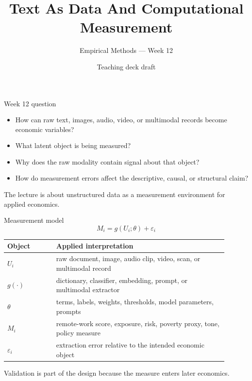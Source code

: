 \documentclass[aspectratio=169,11pt]{beamer}
\title{Text As Data And Computational Measurement}
\subtitle{Empirical Methods --- Week 12}
\author{Teaching deck draft}
\date{}
\newcommand{\1}{\mathbf{1}}
\begin{document}
\begin{frame}
  \titlepage
\end{frame}

\begin{frame}{Week 12 question}
\begin{itemize}
    \item How can raw text, images, audio, video, or multimodal records become economic variables?
    \item What latent object is being measured?
    \item Why does the raw modality contain signal about that object?
    \item How do measurement errors affect the descriptive, causal, or structural claim?
\end{itemize}

\medskip
The lecture is about unstructured data as a measurement environment for applied economics.
\end{frame}

\begin{frame}{Measurement model}
\small
\[
M_i = g(U_i;\theta)+\varepsilon_i
\]

\begin{tabular}{p{0.20\linewidth} p{0.70\linewidth}}
\toprule
Object & Applied interpretation \\
\midrule
\(U_i\) & raw document, image, audio clip, video, scan, or multimodal record \\
\(g(\cdot)\) & dictionary, classifier, embedding, prompt, or multimodal extractor \\
\(\theta\) & terms, labels, weights, thresholds, model parameters, prompts \\
\(M_i\) & remote-work score, exposure, risk, poverty proxy, tone, policy measure \\
\(\varepsilon_i\) & extraction error relative to the intended economic object \\
\bottomrule
\end{tabular}

\medskip
Validation is part of the design because the measure enters later economics.
\end{frame}
\end{document}
